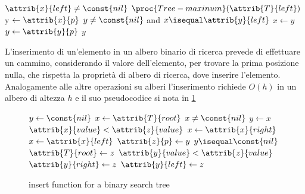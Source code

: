 \begin{codebox}
\li \If $\attrib{x}{left} \neq \const{nil}$
    \Then
\li                     \Return $\proc{Tree-maxinum}(\attrib{T}{left})$
    \End
\li y $\gets \attrib{x}{p}$
\li \While $y \neq \const{nil}$ and $x \isequal \attrib{y}{left}$
    \Do
\li                $x \gets y$
\li                $y \gets \attrib{y}{p}$
    \End
\li \Return $y$
\end{codebox}


L'inserimento di un'elemento in un albero binario di ricerca prevede di effettuare un cammino, considerando il valore dell'elemento, 
per trovare la prima posizione nulla, che rispetta la proprietà di albero di ricerca, dove inserire l'elemento.\newline
Analogamente alle altre operazioni su alberi l'inserimento richiede $O(h)$ in un albero di altezza $h$ e il suo pseudocodice si nota in \ref{alg:insertTreeSearch}
\begin{figure}
    \caption{insert function for a binary search tree}
    \label{alg:insertTreeSearch}
    \begin{codebox}
        \li $ y \gets \const{nil}$
        \li $ x \gets \attrib{T}{root}$
        \li \While $ x \neq \const{nil}$
            \Do
        \li            $ y \gets x $
        \li            \If $\attrib{x}{value} < \attrib{z}{value}$
                       \Then
        \li                           $ x \gets \attrib{x}{right}$
        \li            \Else $x \gets \attrib{x}{left}$
            \End
        \li $\attrib{z}{p} \gets y$
        \li \If $y \isequal \const{nil}$
            \Then
        \li        $\attrib{T}{root} \gets z$
        \li \ElseIf $\attrib{y}{value} < \attrib{z}{value}$
            \Then
        \li                  $\attrib{y}{right} \gets z$
        \li \Else $\attrib{y}{left} \gets z$
    \end{codebox}
\end{figure}


